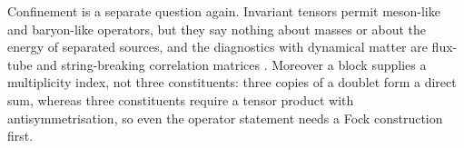 Confinement is a separate question again. Invariant tensors permit meson-like and baryon-like operators, but they say nothing
about masses or about the energy of separated sources, and the diagnostics with dynamical matter are flux-tube and string-breaking
correlation matrices \cite{Bali05}. Moreover a block supplies a multiplicity index, not three constituents: three copies of a doublet
form a direct sum, whereas three constituents require a tensor product with antisymmetrisation, so even the operator statement needs
a Fock construction first.
